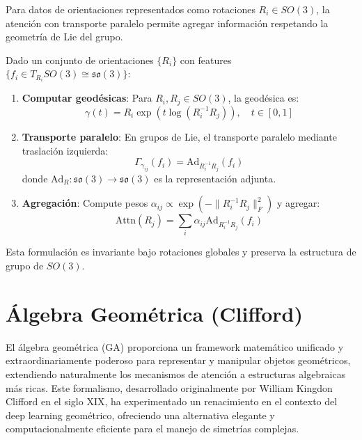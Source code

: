 \begin{example}\label{ex:attention_so3}
Para datos de orientaciones representados como rotaciones $R_i \in SO(3)$, la atención con transporte paralelo permite agregar información respetando la geometría de Lie del grupo.

Dado un conjunto de orientaciones $\{R_i\}$ con features $\{f_i \in T_{R_i}SO(3) \cong \mathfrak{so}(3)\}$:

\begin{enumerate}
    \item \textbf{Computar geodésicas}: Para $R_i, R_j \in SO(3)$, la geodésica es:
    \begin{equation}
    \gamma(t) = R_i \exp(t \log(R_i^{-1} R_j)), \quad t \in [0,1]
    \end{equation}

    \item \textbf{Transporte paralelo}: En grupos de Lie, el transporte paralelo mediante traslación izquierda:
    \begin{equation}
    \Gamma_{\gamma_{ij}}(f_i) = \text{Ad}_{R_i^{-1}R_j}(f_i)
    \end{equation}
    donde $\text{Ad}_R: \mathfrak{so}(3) \to \mathfrak{so}(3)$ es la representación adjunta.

    \item \textbf{Agregación}: Compute pesos $\alpha_{ij} \propto \exp(-\|R_i^{-1}R_j\|_F^2)$ y agregar:
    \begin{equation}
    \text{Attn}(R_j) = \sum_i \alpha_{ij} \text{Ad}_{R_i^{-1}R_j}(f_i)
    \end{equation}
\end{enumerate}

Esta formulación es invariante bajo rotaciones globales y preserva la estructura de grupo de $SO(3)$.
\end{example}

\section{Álgebra Geométrica (Clifford)}\label{sec:clifford_attention}

El álgebra geométrica (GA) proporciona un framework matemático unificado y extraordinariamente poderoso para representar y manipular objetos geométricos, extendiendo naturalmente los mecanismos de atención a estructuras algebraicas más ricas. Este formalismo, desarrollado originalmente por William Kingdon Clifford en el siglo XIX, ha experimentado un renacimiento en el contexto del deep learning geométrico, ofreciendo una alternativa elegante y computacionalmente eficiente para el manejo de simetrías complejas.

